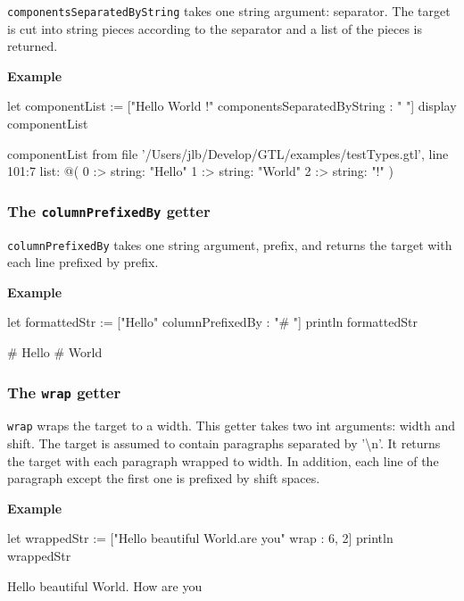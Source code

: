 \documentclass[10pt,openright,twosides,final]{memoir}
\newcommand{\ccst}[1]{{\footnotesize\ttfamily\colorbox{light-blue}{'#1'}}}
\newcommand{\gtlarg}[1]{{\footnotesize\ttfamily\colorbox{light-blue}{#1}}}
\newcommand{\gtlinline}[1]{\colorbox{light-blue}{\lstinline[language=gtl]{#1}}}
\newcommand{\example}{\vspace{.75em}\noindent\textbf{Example}\vspace{0em}}
\begin{document}
\gtlinline{componentsSeparatedByString} takes one string argument: \gtlarg{separator}. The target is cut into string pieces according to the \gtlarg{separator} and a list of the pieces is returned.\

\example
\begin{gtl}
let componentList := ["Hello World !" componentsSeparatedByString : " "]
display componentList
\end{gtl}
\begin{console}
componentList from file '/Users/jlb/Develop/GTL/examples/testTypes.gtl', line 101:7
    list: @(
        0 :>
            string: "Hello"
        1 :>
            string: "World"
        2 :>
            string: "!"
    )
\end{console}

\subsubsection{The \texttt{columnPrefixedBy} getter}

\gtlinline{columnPrefixedBy} takes one string argument, \gtlarg{prefix}, and returns the target with each line prefixed by \gtlarg{prefix}.

\example
\begin{gtl}
let formattedStr := ["Hello\nWorld" columnPrefixedBy : "# "]
println formattedStr
\end{gtl}
\begin{console}
# Hello
# World
\end{console}

\subsubsection{The \texttt{wrap} getter}

\gtlinline{wrap} wraps the target to a width. This getter takes two int arguments: \gtlarg{width} and \gtlarg{shift}. The target is assumed to contain paragraphs separated by \ccst{\textbackslash n}. It returns the target with each paragraph wrapped to \gtlarg{width}. In addition, each line of the paragraph except the first one is prefixed by \gtlarg{shift} spaces.

\example
\begin{gtl}
let wrappedStr := ["Hello beautiful World.\nHow are you" wrap : 6, 2]
println wrappedStr
\end{gtl}
\begin{console}
Hello 
  beautiful 
  World. 
How 
  are 
  you 
\end{console}
\end{document}

